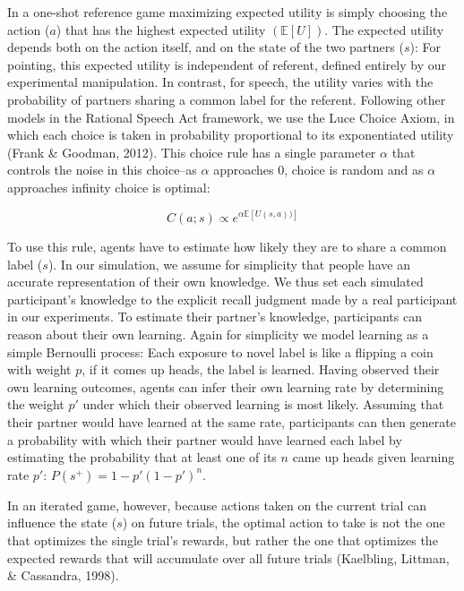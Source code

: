 \documentclass[10pt, letterpaper]{article}
\begin{document}
\newcommand{\E}[1]{\mathbb{E}\left[ #1 \right]}

In a one-shot reference game maximizing expected utility is simply
choosing the action (\(a\)) that has the highest expected utility
\((\E{U})\). The expected utility depends both on the action itself, and
on the state of the two partners (\(s\)): For pointing, this expected
utility is independent of referent, defined entirely by our experimental
manipulation. In contrast, for speech, the utility varies with the
probability of partners sharing a common label for the referent.
Following other models in the Rational Speech Act framework, we use the
Luce Choice Axiom, in which each choice is taken in probability
proportional to its exponentiated utility (Frank \& Goodman, 2012). This
choice rule has a single parameter \(\alpha\) that controls the noise in
this choice--as \(\alpha\) approaches 0, choice is random and as
\(\alpha\) approaches infinity choice is optimal:

\[ 
C\left(a;s\right) \propto e^{\alpha \E{U \left(s,a\right))}}
\]

To use this rule, agents have to estimate how likely they are to share a
common label (\(s\)). In our simulation, we assume for simplicity that
people have an accurate representation of their own knowledge. We thus
set each simulated participant's knowledge to the explicit recall
judgment made by a real participant in our experiments. To estimate
their partner's knowledge, participants can reason about their own
learning. Again for simplicity we model learning as a simple Bernoulli
process: Each exposure to novel label is like a flipping a coin with
weight \(p\), if it comes up heads, the label is learned. Having
observed their own learning outcomes, agents can infer their own
learning rate by determining the weight \(p'\) under which their
observed learning is most likely. Assuming that their partner would have
learned at the same rate, participants can then generate a probability
with which their partner would have learned each label by estimating the
probability that at least one of its \(n\) came up heads given learning
rate \(p'\): \(P\left(s^{+}\right)=1-p'\left( 1-p' \right)^{n}\).

In an iterated game, however, because actions taken on the current trial
can influence the state (\(s\)) on future trials, the optimal action to
take is not the one that optimizes the single trial's rewards, but
rather the one that optimizes the expected rewards that will accumulate
over all future trials (Kaelbling, Littman, \& Cassandra, 1998).
\end{document}
